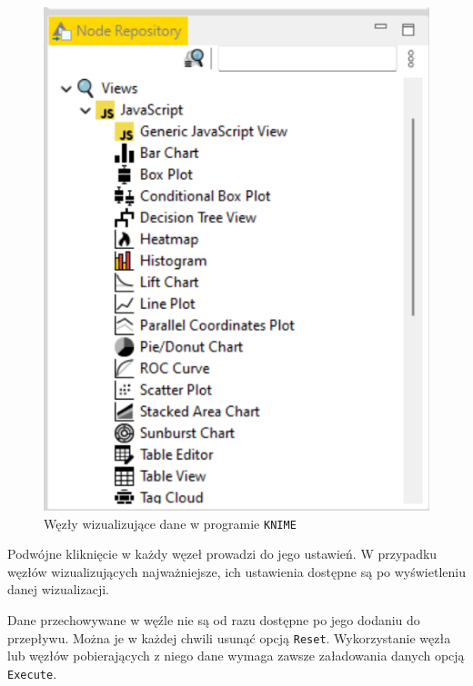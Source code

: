 \documentclass[11pt]{report}
\begin{document}
\begin{figure}[h]
    \centering
    \includegraphics[width=.6\textwidth]{wezly_wizualizujace.png}
    \caption{Węzły wizualizujące dane w programie \texttt{KNIME}\label{fig:wezly_wizualizujace}}
\end{figure}

Podwójne kliknięcie w każdy węzeł prowadzi do jego ustawień. W przypadku węzłów wizualizujących najważniejsze, ich ustawienia dostępne są po wyświetleniu danej wizualizacji.

Dane przechowywane w węźle nie są od razu dostępne po jego dodaniu do przepływu. Można je w każdej chwili usunąć opcją \texttt{Reset}. Wykorzystanie węzła lub węzłów pobierających z niego dane wymaga zawsze załadowania danych opcją \texttt{Execute}.


\printbibliography[heading=subbibliography,title={Strony internetowe},keyword=www]
\end{document}
